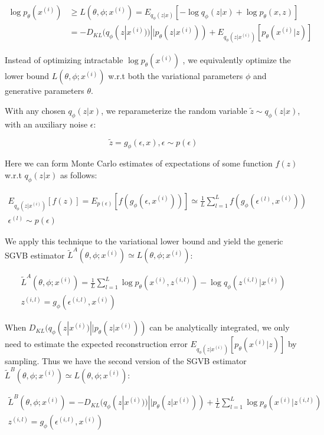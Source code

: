 \documentclass[11pt]{article}
\begin{document}
\begin{align}
\log p_\theta(x^{(i)}) &\geq L(\theta, \phi; x^{(i)})=E_{q_\phi(z|x)}[-\log q_\phi(z|x)+\log p_\theta(x,z)]\\
& =-D_{KL}(q_\phi(z|x^{(i)}))||p_\theta(z|x^{(i)}))+E_{q_\phi(z|x^{(i)})}[p_\theta(x^{(i)}|z)]
\end{align}


Instead of optimizing intractable $\log p_\theta(x^{(i)})$ , we equivalently optimize the lower bound $L(\theta, \phi; x^{(i)})$ w.r.t both the variational parameters $\phi$ and generative parameters $\theta$.

With any chosen $q_\phi(z|x)$, we reparameterize the random variable $\widetilde{z}\sim q_\phi(z|x)$, with an auxiliary noise $\epsilon$:

\begin{equation}
\widetilde{z}=g_\phi(\epsilon, x), \epsilon\sim p(\epsilon)
\end{equation}

Here we can form Monte Carlo estimates of expectations of some function $f(z)$ w.r.t $q_\phi(z|x)$ as follows:

\begin{eqnarray}
E_{q_\phi(z|x^{(i)})}[f(z)]=E_{p(\epsilon)}[f(g_\phi (\epsilon, x^{(i)}))]\simeq\frac{1}{L}\sum^L_{l=1}f(g_\phi (\epsilon^{(l)}, x^{(i)}))  \\
\epsilon^{(l)}\sim p(\epsilon)
\end{eqnarray}

We apply this technique to the variational lower bound and yield the generic SGVB estimator $\widetilde{L}^A(\theta, \phi; x^{(i)})\simeq L(\theta, \phi; x^{(i)})$:

\begin{eqnarray}
\widetilde{L}^A(\theta, \phi; x^{(i)})=\frac{1}{L}\sum^L_{l=1}\log p_\theta (x^{(i)}, z^{(i, l)})-\log q_\phi(z^{(i, l)}|x^{(i)})\\
z^{(i,l)}=g_\phi (\epsilon^{(i, l)}, x^{(i)})
\end{eqnarray}

When $D_{KL}(q_\phi(z|x^{(i)})||p_\theta(z|x^{(i)}))$ can be analytically integrated, we only need to estimate the expected reconstruction error $E_{q_\phi(z|x^{(i)})}[p_\theta(x^{(i)}|z)]$ by sampling. Thus we have the second version of the SGVB estimator $\widetilde{L}^B(\theta, \phi; x^{(i)})\simeq L(\theta, \phi; x^{(i)})$:

\begin{eqnarray}
\widetilde{L}^B(\theta, \phi; x^{(i)})=-D_{KL}(q_\phi(z|x^{(i)}))||p_\theta(z|x^{(i)}))+\frac{1}{L}\sum^L_{l=1}\log p_\theta (x^{(i)}|z^{(i, l)})\\
z^{(i,l)}=g_\phi (\epsilon^{(i, l)}, x^{(i)})
\end{eqnarray}
\end{document}

